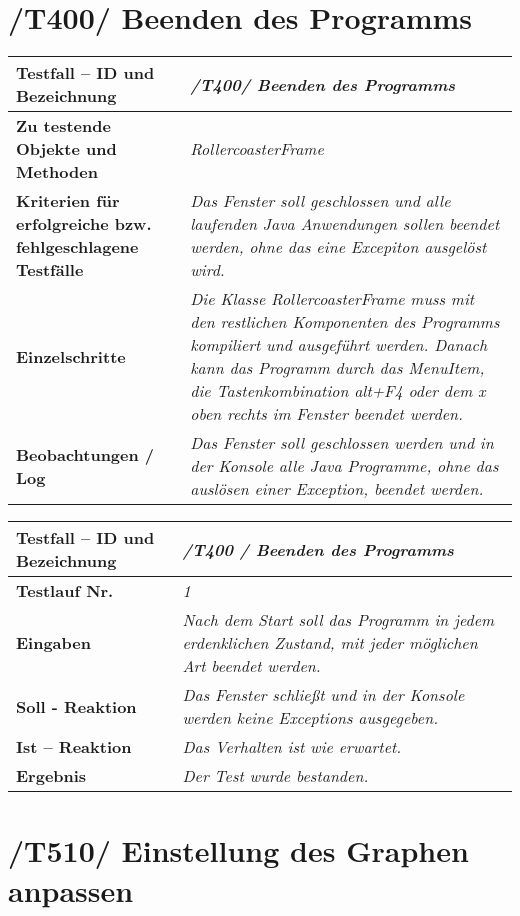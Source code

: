 \section{/T400/ Beenden des Programms}

\begin{longtable}{|p{7cm}|p{10cm}|}
\hline
\textbf{Testfall -- ID und Bezeichnung} &  \textit{/T400/ Beenden des Programms} \\
\hline
\textbf{Zu testende Objekte und Methoden} &  \textit{RollercoasterFrame}
\\
\hline
\textbf{Kriterien für erfolgreiche bzw. fehlgeschlagene Testfälle} &
\textit{Das Fenster soll geschlossen und alle laufenden Java Anwendungen sollen beendet werden, ohne das eine Excepiton ausgelöst wird.} \\
\hline
\textbf{Einzelschritte} &  \textit{Die Klasse RollercoasterFrame muss mit den restlichen Komponenten des Programms kompiliert und ausgeführt werden. Danach kann das Programm durch das MenuItem,
die Tastenkombination alt+F4 oder dem x oben rechts im Fenster beendet werden.} \\
\hline
\textbf{Beobachtungen / Log} &  \textit{Das Fenster soll geschlossen werden und in der Konsole alle Java Programme, ohne das auslösen einer Exception, beendet werden.} \\
\hline
\end{longtable}

\begin{longtable}{|p{7cm}|p{10cm}|}
\hline
\textbf{Testfall -- ID und Bezeichnung} & \textit{ /T400 / Beenden des Programms} \\
\hline
\textbf{Testlauf Nr.} & \textit{1} \\
\hline
\textbf{Eingaben} & \textit{Nach dem Start soll das Programm in jedem erdenklichen Zustand, mit jeder möglichen Art beendet werden.} \\
\hline
\textbf{Soll - Reaktion} & \textit{Das Fenster schließt und in der Konsole werden keine Exceptions ausgegeben.} \\
\hline
\textbf{Ist -- Reaktion} & \textit{Das Verhalten ist wie erwartet.} \\
\hline
\textbf{Ergebnis} & \textit{Der Test wurde bestanden.} \\
\hline
\end{longtable}

\section{/T510/ Einstellung des Graphen anpassen}

